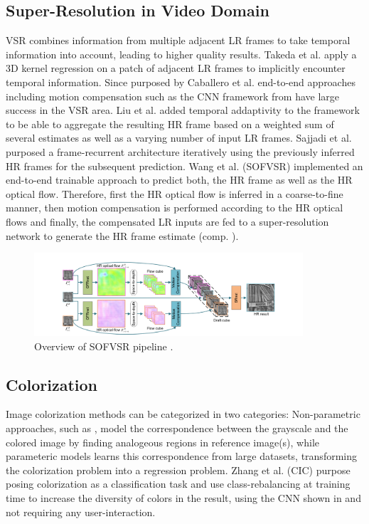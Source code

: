 \subsection{Super-Resolution in Video Domain}
\ac{VSR} combines information from multiple adjacent LR frames
to take temporal information into account, leading to higher quality results.
Takeda et al. \cite{SRWESME} apply a 3D kernel regression on a patch of adjacent
\ac{LR} frames to implicitly encounter temporal information. Since purposed by
Caballero et al. \cite{RTVSRWSTNAMC} end-to-end approaches including motion
compensation such as the CNN framework from \cite{RTVSRWSTNAMC} have large success
in the VSR area. Liu et al. \cite{RVSRWLTD} added temporal addaptivity to the
framework to be able to aggregate the resulting \ac{HR} frame based on a weighted
sum of several estimates as well as a varying number of input LR frames. Sajjadi
et al. \cite{FRVSR} purposed a frame-recurrent architecture iteratively using
the previously inferred \ac{HR} frames for the subsequent prediction. Wang et al.
\cite{LFVSRTHROFE} (SOFVSR) implemented an end-to-end trainable approach to predict
both, the \ac{HR} frame as well as the HR optical flow. Therefore, first the HR
optical flow is inferred in a coarse-to-fine manner, then motion compensation is
performed according to the HR optical flows and finally, the compensated LR
inputs are fed to a super-resolution network to generate the HR frame estimate
(comp. ).

\begin{figure}[!htbp]
	\centering
	\includegraphics[width=10cm]{figures/sofvsr}
	\caption{Overview of SOFVSR pipeline \cite{LFVSRTHROFE}.}
  \label{fig:sofvsr}
\end{figure}

\subsection{Colorization}
Image colorization methods can be categorized in two categories: Non-parametric
approaches, such as \cite{ICUSI}, model the correspondence between the grayscale
and the colored image by finding analogeous regions in reference image(s),
while parameteric models learns this correspondence from large datasets,
transforming the colorization problem into a regression problem. Zhang et al.
\cite{CIC} (CIC) purpose posing colorization as a classification task and use
class-rebalancing at training time to increase the diversity of colors in the
result, using the CNN shown in  and not requiring any
user-interaction.

